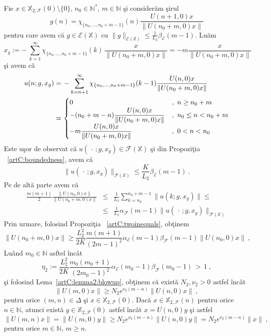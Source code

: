 \documentclass[ a4paper, 12pt]{report}
\newcommand{\E}{\mathcal{E}}
\newcommand{\F}{\mathcal{F}}
\newcommand{\N}{\mathbb{N}}
\newcommand{\X}{\mathbb{X}}
\theoremstyle{definition}
\theoremstyle{remark}
\numberwithin{equation}{section}
\begin{document}
Fie $x\in\X_{2,\F}(0)\setminus\{0\}$, $n_0\in\N^*$, $m\in\N$ \c si consider\u am \c sirul
\begin{equation}
g(n)= \chi_{\{n_0,...,n_0+m-1\}}(n) \frac{U(n+1,0)x}{\|U(n_0+m,0)x\|}
\end{equation}
pentru care avem c\u a $g\in\E(\X)$ cu $\|g\|_{\E(\X)}\leq \frac{1}{L_2}\beta_{\E}(m-1)$. Lu\u am
\begin{equation}
x_g:= -\ \sum_{k=1}^{\infty}\chi_{\{n_0,...,n_0+m-1\}}(k) \, \frac{x}{\|U(n_0+m,0)x\|} = -m \frac{x}{\|U(n_0+m,0)x\|}
\end{equation}
\c si avem c\u a
\begin{gather}
\begin{split}
u(n;g,x_g)=&\,-\sum_{k=n+1}^{\infty} \chi_{\{n_0,...,n_0+m-1\}}(k-1) \frac{U(n,0)x}{\|U(n_0+m,0)x\|}\\
=&\,
\begin{cases}
0 &,\ n\geq n_0+m\\
-(n_0+m - n) \displaystyle\frac{U(n,0)x}{\|U(n_0+m,0)x\|} &,\ n_0\leq n < n_0+m\\
- m \displaystyle\frac{U(n,0)x}{\|U(n_0+m,0)x\|} &,\ 0 < n <n_0
\end{cases}
\end{split}
\end{gather}
Este u\c sor de observat c\u a  $u(\,\cdot\,;g,x_g)\in\F(\X)$ \c si din Propozi\c tia ~\ref{artC:boundedness}, avem c\u a
$$\|u(\,\cdot\,;g,x_g)\|_{\F(\X)}\leq \frac{K}{L_2}\beta_{\E}(m-1)\ .$$
Pe de alt\u a parte avem c\u a
\begin{eqnarray*}
\frac{m(m+1)}{2} \frac{\|U(n_0,0)x\|}{\|U(n_0+m,0)x\|} &\leq& \frac{1}{L_2} \sum_{k=n_0}^{n_0+m-1}\|u(k;g,x_g)\|\leq \\
 &\leq& \frac{1}{L_2} \alpha_{\F}(m-1) \|u(\,\cdot\,;g,x_g)\|_{\F(\X)}
\end{eqnarray*}
Prin urmare, folosind Propozi\c tia ~\ref{artC:twoinequals}, ob\c tinem
\begin{equation}
\|U(n_0+m,0)x\|\geq \frac{L_2^2}{2K} \frac{m(m+1)}{(2m-1)^2} \alpha_{\E}(m-1)\beta_{\F}(m-1)\|U(n_0,0)x\|\ ,
\end{equation}
Lu\^and $m_0\in\N$ asftel \^inc\^at
$$\eta_2:= \frac{L_2^2}{2K} \frac{m_0(m_0+1)}{(2m_0-1)^2} \alpha_{\E}(m_0-1)\beta_{\F}(m_0-1) \,>\,1\ ,$$
\c si folosind Lema~\ref{artC:lemma2:blowup}, ob\c tinem c\u a exist\u a  $N_2,\nu_2>0$ astfel \^inc\^at
$$\|U(m,0)x\|\geq N_2e^{\nu_2(m-n)}\|U(n,0)x\|\ ,$$
pentru orice $(m,n)\in\Delta$ \c si $x\in\X_{2,\F}(0)$.
Dac\u a  $x\in\X_{2,\F}(n)$ pentru orice $n\in\N$, atunci exist\u a  $y\in\X_{2,\F}(0)$ astfel \^inc\^at $x=U(n,0)y$ \c si astfel
$$\|U(m,n)x\|=\|U(m,0)y\|\geq N_2e^{\nu_2(m-n)}\|U(n,0)y\|= N_2e^{\nu_2(m-n)} \|x\|\ ,$$
pentru orice $m\in\N$, $m\geq n$.
\end{document}
